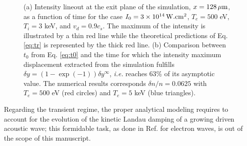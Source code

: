 \documentclass[%
 reprint,
 amsmath,amssymb,
 aps,
]{revtex4-1}
\begin{document}
\begin{figure}
\begin{tabular}{c}
\end{tabular}
\caption{ \label{fig:transient}  
(a) Intensity lineout at the exit plane of the simulation,  $x = 128 \,\rm\mu m$, as  a function of time for the case $I_0 = 3\times 10^{14} \,\rm W.cm^2$, $T_e=500$ eV, $T_i=3$ keV, and $ v_d=0.9c_s$. The maximum of the intensity is illustrated by a thin red line while the  theoretical predictions of Eq. \eqref{eq:tr} is represented by the thick red line.
(b) Comparison between $t_0$ from Eq. \eqref{eq:t0} and the time for which the intensity maximum displacement extracted from the simulation fulfills $\delta y = (1-\exp(-1))\delta y ^{\infty}$, \emph{i.e.} reaches   63\% of its asymptotic value.  The numerical results corresponds $\delta n/n=0.0625$  with   $T_e=500$ eV (red circles) and $T_e=5$ keV  (blue triangles).}
\end{figure}
Regarding the transient regime, the proper analytical modeling requires to account for the evolution of the  kinetic Landau damping of a growing driven acoustic wave; this formidable task, as done in Ref. \cite[]{POP_Benisti_2015}  for   electron waves, is out of the scope of this manuscript. 
\end{document}
